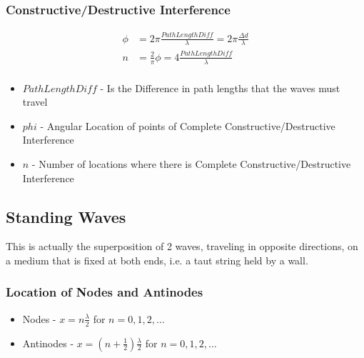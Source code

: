 \documentclass[10pt,letterpaper,final,twoside,notitlepage]{article}
\numberwithin{equation}{section} %
\begin{document}
		\subsubsection*{Constructive/Destructive Interference} \label{subsubsec:Constructive/Destructive Interference}
		\begin{align*}		
			\phi &= 2 \pi \frac{Path Length Diff}{\lambda} = 2 \pi \frac{\Delta d}{\lambda} \\
			n &= \frac{2}{\pi} \phi = 4 \frac{Path Length Diff}{\lambda}\\
		\end{align*}
		\begin{itemize}[noitemsep]
			\item $Path Length Diff$ - Is the Difference in path lengths that the waves must travel
			\item $phi$ - Angular Location of points of Complete Constructive/Destructive Interference
			\item $n$ - Number of locations where there is Complete Constructive/Destructive Interference
		\end{itemize}

	\subsection*{Standing Waves} \label{subsec:Standing Waves}
	This is actually the superposition of 2 waves, traveling in opposite directions, on a medium that is fixed at both ends, i.e. a taut string held by a wall.
		\subsubsection*{Location of Nodes and Antinodes} \label{subsubsec:Node/Antinode Location}
		\begin{itemize}[noitemsep]
			\item Nodes - $x = n \frac{\lambda}{2}$ for $n = 0, 1, 2, \ldots$
			\item Antinodes - $x = \left( n + \frac{1}{2} \right) \frac{\lambda}{2}$ for $n = 0, 1, 2, \ldots$
		\end{itemize}
\end{document}
